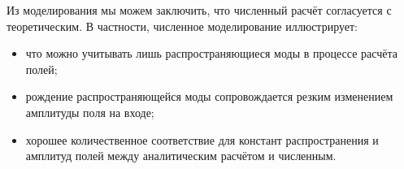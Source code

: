 Из моделирования мы можем заключить, что численный расчёт согласуется с теоретическим. В частности, численное моделирование иллюстрирует: 
\begin{itemize}
    \item что можно учитывать лишь распространяющиеся моды в процессе расчёта полей;
    \item рождение распространяющейся моды сопровождается резким изменением амплитуды поля на входе;
    \item хорошее количественное соответствие для констант распространения и амплитуд полей между аналитическим расчётом и численным.
\end{itemize}


